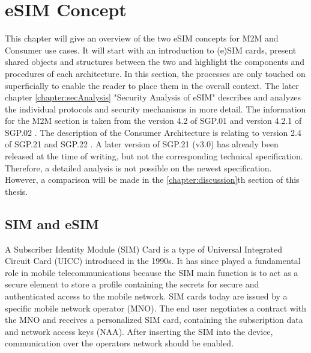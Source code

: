 
\chapter{eSIM Concept}\label{chapter:eSIMArch}
This chapter will give an overview of the two eSIM concepts for M2M and Consumer use cases. It will start with an introduction to (e)SIM cards, present shared objects and structures between the two and highlight the components and procedures of each architecture. In this section, the processes are only touched on superficially to enable the reader to place them in the overall context. The later chapter \ref{chapter:secAnalysis} "Security Analysis of eSIM" describes and analyzes the individual protocols and security mechanisms in more detail. The information for the M2M section is taken from the version 4.2 of SGP.01 \parencite{SGP:01} and version 4.2.1 of SGP.02 \parencite{SGP:02}. The description of the Consumer Architecture is relating to version 2.4 of SGP.21 \parencite{SGP:21} and SGP.22 \parencite{SGP:22}. A later version of SGP.21 (v3.0) has already been released at the time of writing, but not the corresponding technical specification. Therefore, a detailed analysis is not possible on the newest specification. However, a comparison will be made in the \ref{chapter:discussion}th section of this thesis.




\section{SIM and eSIM}

A Subscriber Identity Module (SIM) Card is a type of Universal Integrated Circuit Card (UICC) introduced in the 1990s. It has since played a fundamental role in mobile telecommunications because the SIM main function is to act as a secure element to store a profile containing the secrets for secure and authenticated access to the mobile network. SIM cards today are issued by a specific mobile network operator (\acrshort{MNO}). The end user negotiates a contract with the MNO and receives a personalized SIM card, containing the subscription data and network access keys (\acrshort{NAA}). After inserting the SIM into the device, communication over the operators network should be enabled.

